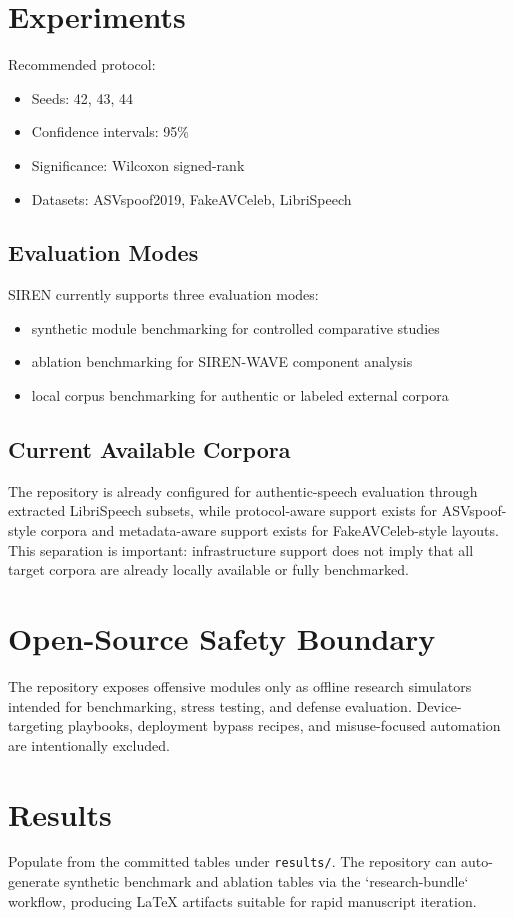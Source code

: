 \documentclass[conference]{IEEEtran}
\begin{document}
\section{Experiments}
Recommended protocol:
\begin{itemize}
\item Seeds: 42, 43, 44
\item Confidence intervals: 95\%
\item Significance: Wilcoxon signed-rank
\item Datasets: ASVspoof2019, FakeAVCeleb, LibriSpeech
\end{itemize}

\subsection{Evaluation Modes}
SIREN currently supports three evaluation modes:
\begin{itemize}
\item synthetic module benchmarking for controlled comparative studies
\item ablation benchmarking for SIREN-WAVE component analysis
\item local corpus benchmarking for authentic or labeled external corpora
\end{itemize}

\subsection{Current Available Corpora}
The repository is already configured for authentic-speech evaluation through extracted LibriSpeech subsets, while protocol-aware support exists for ASVspoof-style corpora and metadata-aware support exists for FakeAVCeleb-style layouts. This separation is important: infrastructure support does not imply that all target corpora are already locally available or fully benchmarked.

\section{Open-Source Safety Boundary}
The repository exposes offensive modules only as offline research simulators intended for benchmarking, stress testing, and defense evaluation. Device-targeting playbooks, deployment bypass recipes, and misuse-focused automation are intentionally excluded.

\section{Results}
Populate from the committed tables under \texttt{results/}. The repository can auto-generate synthetic benchmark and ablation tables via the `research-bundle` workflow, producing LaTeX artifacts suitable for rapid manuscript iteration.
\end{document}
